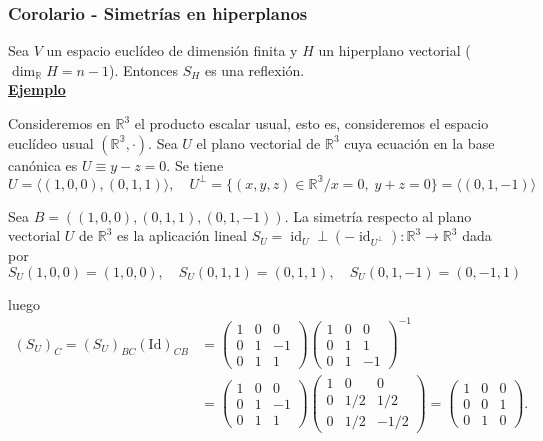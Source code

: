 \documentclass[12pt, a4paper, ones, notitlepage, openany,titlepage]{article}
\newcommand{\ejemplo}{\noindent\underline{\textbf{Ejemplo}}}
\begin{document}
\subsubsection{Corolario - Simetrías en hiperplanos}
Sea $V$ un espacio euclídeo de dimensión finita y $H$ un hiperplano vectorial ($\operatorname{dim}_\mathbb{R}H = n - 1$). Entonces $S_H$ es una reflexión.\\

\ejemplo

Consideremos en $\mathbb{R}^{3}$ el producto escalar usual, esto es, consideremos el espacio euclídeo usual $(\mathbb{R^3}, \cdot)$. Sea $U$ el plano vectorial de $\mathbb{R}^{3}$ cuya ecuación en la base canónica es $U\equiv y-z=0$. Se tiene
$$
U=\langle(1,0,0),(0,1,1)\rangle, \quad U^{\perp}=\{(x, y, z) \in \mathbb{R^3} / x = 0, \; y + z = 0\}=\langle(0,1,-1)\rangle
$$

Sea $B=((1,0,0),(0,1,1),(0,1,-1))$. La simetría respecto al plano vectorial $U$ de $\mathbb{R}^{3}$ es la aplicación lineal $S_{U}=\operatorname{id}_{U} \perp\left(-\operatorname{id}_{U^{\perp}}\right): \mathbb{R}^{3} \rightarrow \mathbb{R}^{3}$ dada por
$$
S_{U}(1,0,0)=(1,0,0), \quad S_{U}(0,1,1)=(0,1,1), \quad S_{U}(0,1,-1)=(0,-1,1)
$$

\noindent luego
$$
\begin{aligned}
	\left(S_{U}\right)_{C}=\left(S_{U}\right)_{B C} \operatorname{(Id)}_{C B} & =\left(\begin{array}{rrr}
		1 & 0 & 0 \\
		0 & 1 & -1 \\
		0 & 1 & 1
	\end{array}\right)\left(\begin{array}{rrr}
		1 & 0 & 0 \\
		0 & 1 & 1 \\
		0 & 1 & -1
	\end{array}\right)^{-1} \\
	& =\left(\begin{array}{rrr}
		1 & 0 & 0 \\
		0 & 1 & -1 \\
		0 & 1 & 1
	\end{array}\right)\left(\begin{array}{rrr}
		1 & 0 & 0 \\
		0 & 1 / 2 & 1 / 2 \\
		0 & 1 / 2 & -1 / 2
	\end{array}\right)=\left(\begin{array}{lll}
		1 & 0 & 0 \\
		0 & 0 & 1 \\
		0 & 1 & 0
	\end{array}\right) .
\end{aligned}
$$
\end{document}
